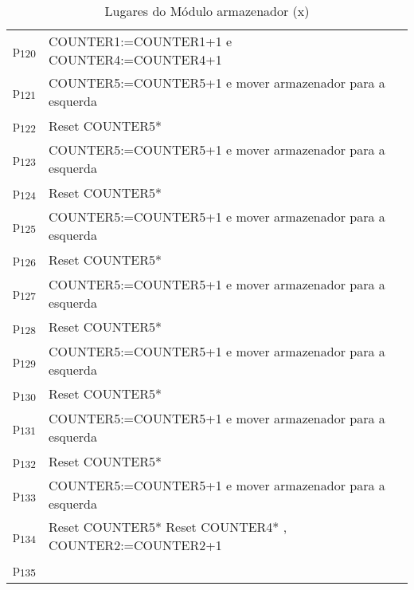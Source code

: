 \begin{table}[htbp]
\caption{Lugares do Módulo armazenador (x)}
\centering
\begin{tabular}{ll}
p\textsubscript{120} & COUNTER1:=COUNTER1+1 e COUNTER4:=COUNTER4+1\\
p\textsubscript{121} & COUNTER5:=COUNTER5+1 e mover armazenador para a esquerda\\
p\textsubscript{122} & Reset COUNTER5*\\
p\textsubscript{123} & COUNTER5:=COUNTER5+1 e mover armazenador para a esquerda\\
p\textsubscript{124} & Reset COUNTER5*\\
p\textsubscript{125} & COUNTER5:=COUNTER5+1 e mover armazenador para a esquerda\\
p\textsubscript{126} & Reset COUNTER5*\\
p\textsubscript{127} & COUNTER5:=COUNTER5+1 e mover armazenador para a esquerda\\
p\textsubscript{128} & Reset COUNTER5*\\
p\textsubscript{129} & COUNTER5:=COUNTER5+1 e mover armazenador para a esquerda\\
p\textsubscript{130} & Reset COUNTER5*\\
p\textsubscript{131} & COUNTER5:=COUNTER5+1 e mover armazenador para a esquerda\\
p\textsubscript{132} & Reset COUNTER5*\\
p\textsubscript{133} & COUNTER5:=COUNTER5+1 e mover armazenador para a esquerda\\
p\textsubscript{134} & Reset COUNTER5* Reset COUNTER4* , COUNTER2:=COUNTER2+1\\
p\textsubscript{135} & \\
\end{tabular}
\end{table}

